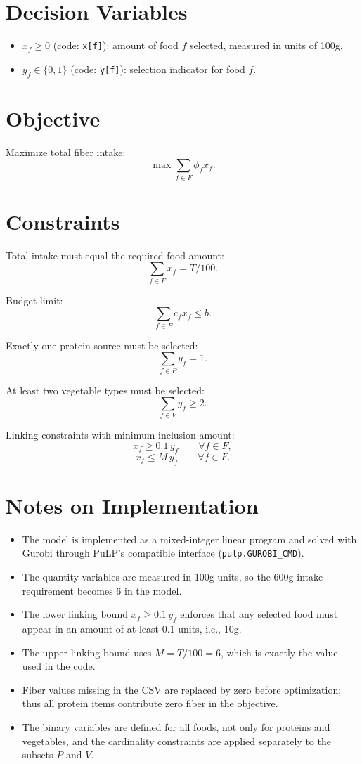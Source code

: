\section*{Decision Variables}

\begin{itemize}
    \item $x_f \ge 0$ (code: \texttt{x[f]}): amount of food $f$ selected, measured in units of 100g.
    \item $y_f \in \{0,1\}$ (code: \texttt{y[f]}): selection indicator for food $f$.
\end{itemize}

\section*{Objective}

Maximize total fiber intake:
\[
\max \sum_{f \in F} \phi_f x_f.
\]

\section*{Constraints}

Total intake must equal the required food amount:
\[
\sum_{f \in F} x_f = T/100.
\]

Budget limit:
\[
\sum_{f \in F} c_f x_f \le b.
\]

Exactly one protein source must be selected:
\[
\sum_{f \in P} y_f = 1.
\]

At least two vegetable types must be selected:
\[
\sum_{f \in V} y_f \ge 2.
\]

Linking constraints with minimum inclusion amount:
\[
x_f \ge 0.1\, y_f \qquad \forall f \in F,
\]
\[
x_f \le M\, y_f \qquad \forall f \in F.
\]

\section*{Notes on Implementation}

\begin{itemize}
    \item The model is implemented as a mixed-integer linear program and solved with Gurobi through PuLP's compatible interface (\texttt{pulp.GUROBI\_CMD}).
    \item The quantity variables are measured in 100g units, so the 600g intake requirement becomes $6$ in the model.
    \item The lower linking bound $x_f \ge 0.1\,y_f$ enforces that any selected food must appear in an amount of at least $0.1$ units, i.e., 10g.
    \item The upper linking bound uses $M=T/100=6$, which is exactly the value used in the code.
    \item Fiber values missing in the CSV are replaced by zero before optimization; thus all protein items contribute zero fiber in the objective.
    \item The binary variables are defined for all foods, not only for proteins and vegetables, and the cardinality constraints are applied separately to the subsets $P$ and $V$.
\end{itemize}

